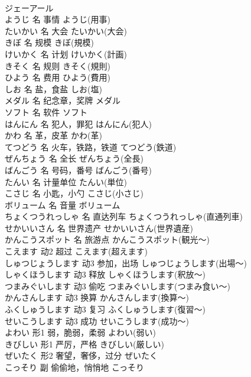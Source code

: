 \documentclass[8pt]{extreport}
\begin{document}
\begin{CJK}{UTF8}{min}
\\	ジェーアール
\\	ようじ	名	事情	ようじ(用事)	
\\	たいかい	名	大会	たいかい(大会)	
\\	きぼ	名	规模	きぼ(規模)	
\\	けいかく	名	计划	けいかく(計画)	
\\	きそく	名	规则	きそく(規則)	
\\	ひよう	名	费用	ひよう(費用)	
\\	しお	名	盐，食盐	しお(塩)	
\\	メダル	名	纪念章，奖牌	メダル	
\\	ソフト	名	软件	ソフト	
\\	はんにん	名	犯人，罪犯	はんにん(犯人)	
\\	かわ	名	革，皮革	かわ(革)	
\\	てつどう	名	火车，铁路，铁道	てつどう(鉄道)	
\\	ぜんちょう	名	全长	ぜんちょう(全長)	
\\	ばんごう	名	号码，番号	ばんごう(番号)	
\\	たんい	名	计量单位	たんい(単位)	
\\	こさじ	名	小匙，小勺	こさじ(小さじ)	
\\	ボリューム	名	音量	ボリューム	
\\	ちょくつうれっしゃ	名	直达列车	ちょくつうれっしゃ(直通列車)	
\\	せかいいさん	名	世界遗产	せかいいさん(世界遺産)	
\\	かんこうスポット	名	旅游点	かんこうスポット(観光～)	
\\	こえます	动2	超过	こえます(超えます)	
\\	しゅつじょうします	动3	参加，出场	しゅつじょうします(出場～)	
\\	しゃくほうします	动3	释放	しゃくほうします(釈放～)	
\\	つまみぐいします	动3	偷吃	つまみぐいします(つまみ食い～)	
\\	かんさんします	动3	换算	かんさんします(換算～)	
\\	ふくしゅうします	动3	复习	ふくしゅうします(復習～)	
\\	せいこうします	动3	成功	せいこうします(成功～)	
\\	よわい	形1	弱，脆弱，柔弱	よわい(弱い)	
\\	きびしい	形1	严厉，严格	きびしい(厳しい)	
\\	ぜいたく	形2	奢望，奢侈，过分	ぜいたく	
\\	こっそり	副	偷偷地，悄悄地	こっそり	

\end{CJK}
\end{document}
